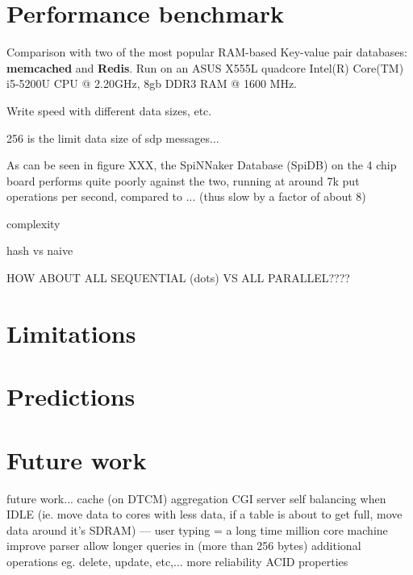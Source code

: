 \section{Performance benchmark}

Comparison with two of the most popular RAM-based Key-value pair databases: \textbf{memcached} and \textbf{Redis}.
Run on an ASUS X555L quadcore Intel(R) Core(TM) i5-5200U CPU @ 2.20GHz, 8gb DDR3 RAM @ 1600 MHz.

Write speed with different data sizes, etc.

256 is the limit data size of sdp messages...

As can be seen in figure XXX, the SpiNNaker Database (SpiDB) on the 4 chip board performs quite poorly against the two, running at around 7k put operations per second, compared to ... (thus slow by a factor of about 8) 

complexity

hash vs naive

HOW ABOUT ALL SEQUENTIAL (dots) VS ALL PARALLEL????

\section{Limitations}

\section{Predictions}

\section{Future work}
future work...
cache (on DTCM)
aggregation
CGI server
self balancing when IDLE (ie. move data to cores with less data, if a table is about to get full, move data around it's SDRAM) --- user typing = a long time
million core machine
improve parser
allow longer queries in (more than 256 bytes)
additional operations eg. delete, update, etc,...
more reliability
ACID properties